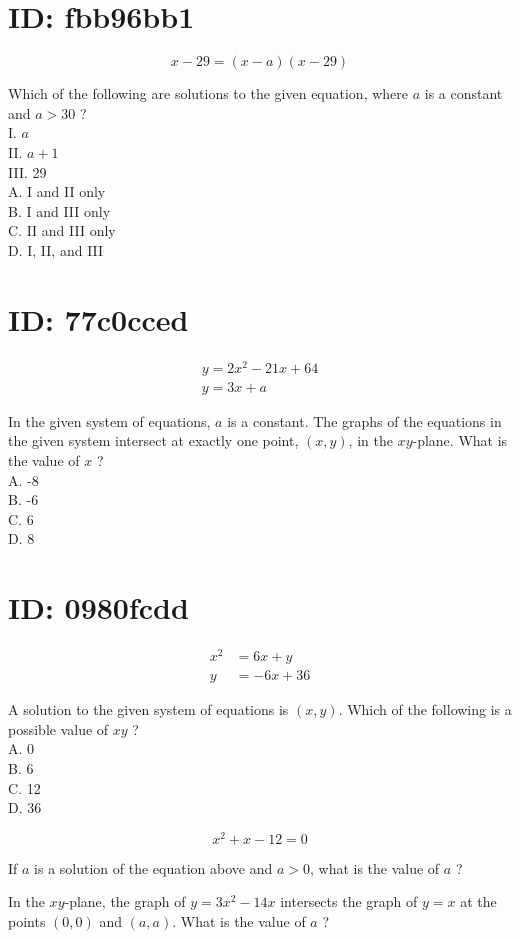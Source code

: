 \section*{ID: fbb96bb1}
$$
x-29=(x-a)(x-29)
$$

Which of the following are solutions to the given equation, where $a$ is a constant and $a>30$ ?\\
I. $a$\\
II. $a+1$\\
III. 29\\
A. I and II only\\
B. I and III only\\
C. II and III only\\
D. I, II, and III

\section*{ID: 77c0cced}
$$
\begin{gathered}
y=2 x^{2}-21 x+64 \\
y=3 x+a
\end{gathered}
$$

In the given system of equations, $a$ is a constant. The graphs of the equations in the given system intersect at exactly one point, $(x, y)$, in the $x y$-plane. What is the value of $x$ ?\\
A. -8\\
B. -6\\
C. 6\\
D. 8

\section*{ID: 0980fcdd}
$$
\begin{aligned}
x^{2} & =6 x+y \\
y & =-6 x+36
\end{aligned}
$$

A solution to the given system of equations is $(x, y)$. Which of the following is a possible value of $x y$ ?\\
A. 0\\
B. 6\\
C. 12\\
D. 36

$$
x^{2}+x-12=0
$$

If $a$ is a solution of the equation above and $a>0$, what is the value of $a$ ?

In the $x y$-plane, the graph of $y=3 x^{2}-14 x$ intersects the graph of $y=x$ at the points $(0,0)$ and $(a, a)$. What is the value of $a$ ?

